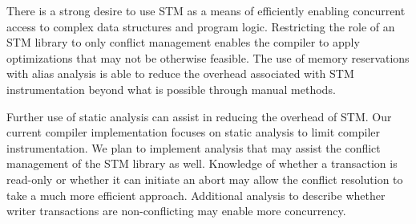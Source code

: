 \documentclass[preprint]{sigplanconf}
\begin{document}
There is a strong desire to use STM as a means of efficiently enabling concurrent access to complex data structures and program logic. Restricting the role of an STM library to only conflict management enables the compiler to apply optimizations that may not be otherwise feasible. The use of memory reservations with alias analysis is able to reduce the overhead associated with STM instrumentation beyond what is possible through manual methods.

Further use of static analysis can assist in reducing the overhead of STM. Our current compiler implementation focuses on static analysis to limit compiler instrumentation. We plan to implement analysis that may assist the conflict management of the STM library as well. Knowledge of whether a transaction is read-only or whether it can initiate an abort may allow the conflict resolution to take a much more efficient approach. Additional analysis to describe whether writer transactions are non-conflicting may enable more concurrency.

\appendix



\end{document}
